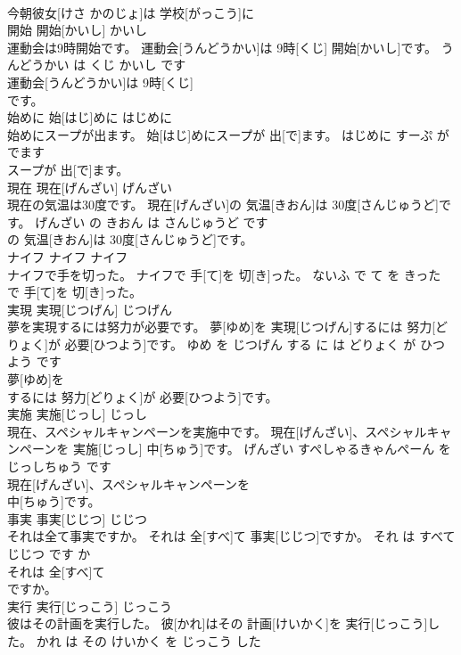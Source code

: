 \documentclass[8pt]{extreport}
\begin{document}
\begin{CJK}{UTF8}{min}
\\	今朝彼女[けさ かのじょ]は 学校[がっこう]に
\\	開始	開始[かいし]	かいし	
\\	運動会は9時開始です。	運動会[うんどうかい]は 9時[くじ] 開始[かいし]です。	うんどうかい は くじ かいし です	
\\	運動会[うんどうかい]は 9時[くじ]
\\	です。			
\\	始めに	始[はじ]めに	はじめに	
\\	始めにスープが出ます。	始[はじ]めにスープが 出[で]ます。	はじめに すーぷ が でます	
\\	スープが 出[で]ます。			
\\	現在	現在[げんざい]	げんざい	
\\	現在の気温は30度です。	現在[げんざい]の 気温[きおん]は 30度[さんじゅうど]です。	げんざい の きおん は さんじゅうど です	
\\	の 気温[きおん]は 30度[さんじゅうど]です。			
\\	ナイフ	ナイフ	ナイフ	
\\	ナイフで手を切った。	ナイフで 手[て]を 切[き]った。	ないふ で て を きった	
\\	で 手[て]を 切[き]った。			
\\	実現	実現[じつげん]	じつげん	
\\	夢を実現するには努力が必要です。	夢[ゆめ]を 実現[じつげん]するには 努力[どりょく]が 必要[ひつよう]です。	ゆめ を じつげん する に は どりょく が ひつよう です	
\\	夢[ゆめ]を
\\	するには 努力[どりょく]が 必要[ひつよう]です。			
\\	実施	実施[じっし]	じっし	
\\	現在、スペシャルキャンペーンを実施中です。	現在[げんざい]、スペシャルキャンペーンを 実施[じっし] 中[ちゅう]です。	げんざい すぺしゃるきゃんぺーん を じっしちゅう です	
\\	現在[げんざい]、スペシャルキャンペーンを
\\	中[ちゅう]です。			
\\	事実	事実[じじつ]	じじつ	
\\	それは全て事実ですか。	それは 全[すべ]て 事実[じじつ]ですか。	それ は すべて じじつ です か	
\\	それは 全[すべ]て
\\	ですか。			
\\	実行	実行[じっこう]	じっこう	
\\	彼はその計画を実行した。	彼[かれ]はその 計画[けいかく]を 実行[じっこう]した。	かれ は その けいかく を じっこう した	

\end{CJK}
\end{document}
